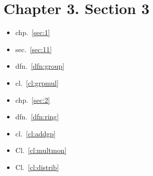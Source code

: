 \hypertarget{section-3}{%
\section{Chapter 3. Section 3}\label{section-3}}

\begin{itemize}
\item
  chp.~\ref{sec:1}
\item
  sec.~\ref{sec:11}
\item
  dfn.~\ref{dfn:group}
\item
  cl.~\ref{cl:grpmul}
\item
  chp.~\ref{sec:2}
\item
  dfn.~\ref{dfn:ring}
\item
  cl.~\ref{cl:addgp}
\item
  Cl.~\ref{cl:multmon}
\item
  Cl.~\ref{cl:distrib}
\end{itemize}
